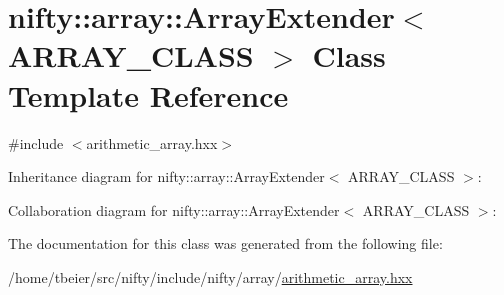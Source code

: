 \hypertarget{classnifty_1_1array_1_1ArrayExtender}{}\section{nifty\+:\+:array\+:\+:Array\+Extender$<$ A\+R\+R\+A\+Y\+\_\+\+C\+L\+A\+S\+S $>$ Class Template Reference}
\label{classnifty_1_1array_1_1ArrayExtender}


{\ttfamily \#include $<$arithmetic\+\_\+array.\+hxx$>$}



Inheritance diagram for nifty\+:\+:array\+:\+:Array\+Extender$<$ A\+R\+R\+A\+Y\+\_\+\+C\+L\+A\+S\+S $>$\+:


Collaboration diagram for nifty\+:\+:array\+:\+:Array\+Extender$<$ A\+R\+R\+A\+Y\+\_\+\+C\+L\+A\+S\+S $>$\+:


The documentation for this class was generated from the following file\+:\begin{DoxyCompactItemize}
\item 
/home/tbeier/src/nifty/include/nifty/array/\hyperlink{arithmetic__array_8hxx}{arithmetic\+\_\+array.\+hxx}\end{DoxyCompactItemize}
